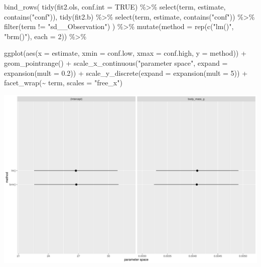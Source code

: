 \documentclass[
  letterpaper,
  DIV=11,
  numbers=noendperiod]{scrartcl}
\newenvironment{Shaded}{\begin{snugshade}}{\end{snugshade}}
\newcommand{\AttributeTok}[1]{\textcolor[rgb]{0.40,0.45,0.13}{#1}}
\newcommand{\ConstantTok}[1]{\textcolor[rgb]{0.56,0.35,0.01}{#1}}
\newcommand{\DecValTok}[1]{\textcolor[rgb]{0.68,0.00,0.00}{#1}}
\newcommand{\FloatTok}[1]{\textcolor[rgb]{0.68,0.00,0.00}{#1}}
\newcommand{\FunctionTok}[1]{\textcolor[rgb]{0.28,0.35,0.67}{#1}}
\newcommand{\NormalTok}[1]{\textcolor[rgb]{0.00,0.23,0.31}{#1}}
\newcommand{\SpecialCharTok}[1]{\textcolor[rgb]{0.37,0.37,0.37}{#1}}
\newcommand{\StringTok}[1]{\textcolor[rgb]{0.13,0.47,0.30}{#1}}
\begin{document}
\begin{Shaded}
\begin{Highlighting}[]
\FunctionTok{bind\_rows}\NormalTok{(}
  \FunctionTok{tidy}\NormalTok{(fit2.ols, }\AttributeTok{conf.int =} \ConstantTok{TRUE}\NormalTok{) }\SpecialCharTok{\%\textgreater{}\%} \FunctionTok{select}\NormalTok{(term, estimate, }\FunctionTok{contains}\NormalTok{(}\StringTok{"conf"}\NormalTok{)),}
  \FunctionTok{tidy}\NormalTok{(fit2.b) }\SpecialCharTok{\%\textgreater{}\%} \FunctionTok{select}\NormalTok{(term, estimate, }\FunctionTok{contains}\NormalTok{(}\StringTok{"conf"}\NormalTok{)) }\SpecialCharTok{\%\textgreater{}\%} \FunctionTok{filter}\NormalTok{(term }\SpecialCharTok{!=} \StringTok{"sd\_\_Observation"}\NormalTok{)}
\NormalTok{) }\SpecialCharTok{\%\textgreater{}\%} 
  \FunctionTok{mutate}\NormalTok{(}\AttributeTok{method =} \FunctionTok{rep}\NormalTok{(}\FunctionTok{c}\NormalTok{(}\StringTok{"lm()"}\NormalTok{, }\StringTok{"brm()"}\NormalTok{), }\AttributeTok{each =} \DecValTok{2}\NormalTok{)) }\SpecialCharTok{\%\textgreater{}\%} 
  
  \FunctionTok{ggplot}\NormalTok{(}\FunctionTok{aes}\NormalTok{(}\AttributeTok{x =}\NormalTok{ estimate, }\AttributeTok{xmin =}\NormalTok{ conf.low, }\AttributeTok{xmax =}\NormalTok{ conf.high, }\AttributeTok{y =}\NormalTok{ method)) }\SpecialCharTok{+}
  \FunctionTok{geom\_pointrange}\NormalTok{() }\SpecialCharTok{+}
  \FunctionTok{scale\_x\_continuous}\NormalTok{(}\StringTok{"parameter space"}\NormalTok{, }\AttributeTok{expand =} \FunctionTok{expansion}\NormalTok{(}\AttributeTok{mult =} \FloatTok{0.2}\NormalTok{)) }\SpecialCharTok{+}
  \FunctionTok{scale\_y\_discrete}\NormalTok{(}\AttributeTok{expand =} \FunctionTok{expansion}\NormalTok{(}\AttributeTok{mult =} \DecValTok{5}\NormalTok{)) }\SpecialCharTok{+}
  \FunctionTok{facet\_wrap}\NormalTok{(}\SpecialCharTok{\textasciitilde{}}\NormalTok{ term, }\AttributeTok{scales =} \StringTok{"free\_x"}\NormalTok{)}
\end{Highlighting}
\end{Shaded}

\includegraphics{Bayes_Lab_1_files/figure-pdf/unnamed-chunk-32-1.pdf}
\end{document}
